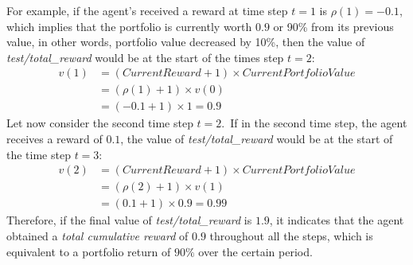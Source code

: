 \documentclass[../xlapes02]{subfiles}
\begin{document}
    For example, if the agent's received a reward at time step $t=1$ is $\rho(1)=-0.1$, which implies that the portfolio is currently worth $0.9$ or 90\% from its previous value, in other words, portfolio value decreased by 10\%, then the value of \emph{test/total\_reward} would be at the start of the times step $t=2$:
    \begin{equation}
        \label{eq:portfolio-value-example}
        \begin{split}
            v(1) &= (CurrentReward+1)\times CurrentPortfolioValue  \\
            &= (\rho(1)+1)\times v(0) \\
            &= (-0.1+1)\times 1 = 0.9
        \end{split}
    \end{equation}
    Let now consider the second time step $t=2$.\ If in the second time step, the agent receives a reward of $0.1$, the value of \emph{test/total\_reward} would be at the start of the time step $t=3$:
    \begin{equation}
        \begin{split}
            v(2) &= (CurrentReward+1)\times CurrentPortfolioValue  \\
            &= (\rho(2)+1)\times v(1) \\
            &= (0.1+1) \times 0.9 = 0.99
        \end{split}
    \end{equation}
    Therefore, if the final value of \emph{test/total\_reward} is $1.9$, it indicates that the agent obtained a \emph{total cumulative reward} of $0.9$ throughout all the steps, which is equivalent to a portfolio return of $90\%$ over the certain period.
\end{document}
